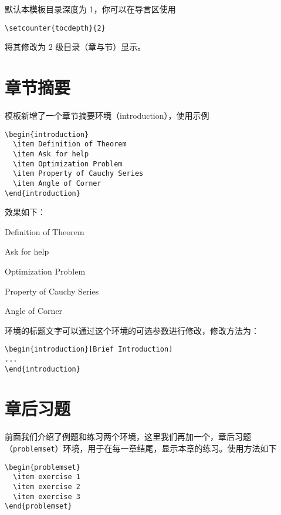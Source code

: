 \documentclass[lang=cn,10pt]{elegantbook}
\begin{document}
默认本模板目录深度为 1，你可以在导言区使用
\begin{lstlisting}
\setcounter{tocdepth}{2}
\end{lstlisting}
将其修改为 2 级目录（章与节）显示。


\section{章节摘要}
模板新增了一个章节摘要环境（introduction），使用示例
\begin{lstlisting}
\begin{introduction}
  \item Definition of Theorem
  \item Ask for help
  \item Optimization Problem
  \item Property of Cauchy Series
  \item Angle of Corner
\end{introduction}
\end{lstlisting}
效果如下：
\begin{introduction}
  \item Definition of Theorem
  \item Ask for help
  \item Optimization Problem
  \item Property of Cauchy Series
  \item Angle of Corner
\end{introduction}

环境的标题文字可以通过这个环境的可选参数进行修改，修改方法为：
\begin{lstlisting}
\begin{introduction}[Brief Introduction]
...
\end{introduction}
\end{lstlisting}

\section{章后习题}
前面我们介绍了例题和练习两个环境，这里我们再加一个，章后习题（\lstinline{problemset}）环境，用于在每一章结尾，显示本章的练习。使用方法如下

\begin{lstlisting}
\begin{problemset}
  \item exercise 1
  \item exercise 2
  \item exercise 3
\end{problemset}
\end{lstlisting}
\end{document}
